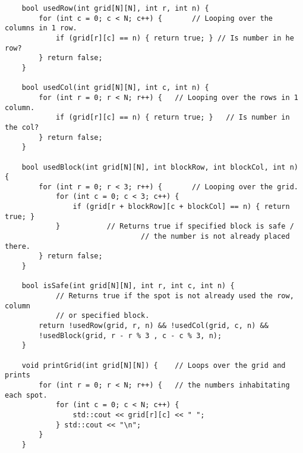 \documentclass[11pt]{amsart}
\begin{document}
\begin{verbatim}
	bool usedRow(int grid[N][N], int r, int n) {
	    for (int c = 0; c < N; c++) {		// Looping over the columns in 1 row.
	        if (grid[r][c] == n) { return true; } // Is number in he row?
	    } return false;
	}

	bool usedCol(int grid[N][N], int c, int n) {
	    for (int r = 0; r < N; r++) {	// Looping over the rows in 1 column.
	        if (grid[r][c] == n) { return true; }	// Is number in the col?
	    } return false;
	}

	bool usedBlock(int grid[N][N], int blockRow, int blockCol, int n) {
	    for (int r = 0; r < 3; r++) {		// Looping over the grid.
	        for (int c = 0; c < 3; c++) {
	            if (grid[r + blockRow][c + blockCol] == n) { return true; }
	        }			// Returns true if specified block is safe /
								// the number is not already placed there.
	    } return false;
	}

	bool isSafe(int grid[N][N], int r, int c, int n) {
			// Returns true if the spot is not already used the row, column
			// or specified block.
	    return !usedRow(grid, r, n) && !usedCol(grid, c, n) &&
	    !usedBlock(grid, r - r % 3 , c - c % 3, n);
	}

	void printGrid(int grid[N][N]) {	// Loops over the grid and prints
	    for (int r = 0; r < N; r++) {	// the numbers inhabitating each spot.
	        for (int c = 0; c < N; c++) {
	            std::cout << grid[r][c] << " ";
	        } std::cout << "\n";
	    }
	}


\end{verbatim}
\end{document}
